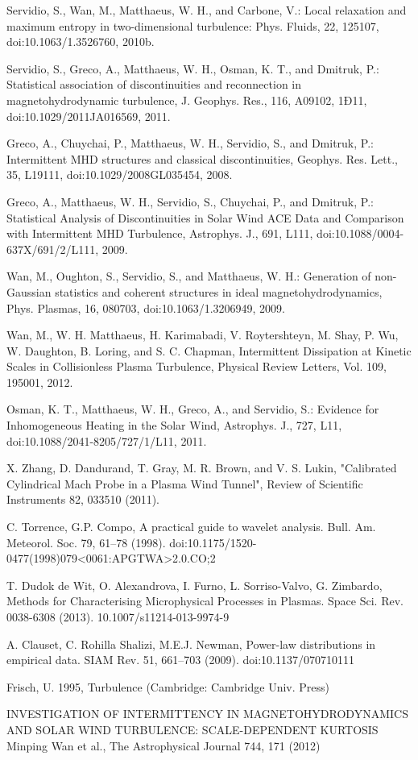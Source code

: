 \documentclass[12pt]{iopart}
\begin{document}
\begin{thebibliography}{10}
Servidio, S., Wan, M., Matthaeus, W. H., and Carbone, V.: Local relaxation and maximum entropy in two-dimensional turbulence: Phys. Fluids, 22, 125107, doi:10.1063/1.3526760, 2010b.

Servidio, S., Greco, A., Matthaeus, W. H., Osman, K. T., and Dmitruk, P.: Statistical association of discontinuities and reconnection in magnetohydrodynamic turbulence, J. Geophys. Res., 116, A09102, 1Ð11, doi:10.1029/2011JA016569, 2011.

Greco, A., Chuychai, P., Matthaeus, W. H., Servidio, S., and Dmitruk, P.: Intermittent MHD structures and classical discontinuities, Geophys. Res. Lett., 35, L19111, doi:10.1029/2008GL035454, 2008.

Greco, A., Matthaeus, W. H., Servidio, S., Chuychai, P., and Dmitruk, P.: Statistical Analysis of Discontinuities in Solar Wind ACE Data and Comparison with Intermittent MHD Turbulence, Astrophys. J., 691, L111, doi:10.1088/0004-637X/691/2/L111, 2009.

Wan, M., Oughton, S., Servidio, S., and Matthaeus, W. H.: Generation of non-Gaussian statistics and coherent structures in ideal magnetohydrodynamics, Phys. Plasmas, 16, 080703, doi:10.1063/1.3206949, 2009.

Wan, M., W. H. Matthaeus, H. Karimabadi, V. Roytershteyn, M. Shay, P. Wu, W. Daughton, B. Loring, and S. C. Chapman, Intermittent Dissipation at Kinetic Scales in Collisionless Plasma Turbulence, Physical Review Letters, Vol. 109, 195001, 2012. 

Osman, K. T., Matthaeus, W. H., Greco, A., and Servidio, S.: Evidence for Inhomogeneous Heating in the Solar Wind, Astrophys. J., 727, L11, doi:10.1088/2041-8205/727/1/L11, 2011.

X. Zhang, D. Dandurand, T. Gray, M. R. Brown, and V. S. Lukin, "Calibrated Cylindrical Mach Probe in a Plasma Wind Tunnel", Review of Scientific Instruments 82, 033510 (2011).

C. Torrence, G.P. Compo, A practical guide to wavelet analysis. Bull. Am. Meteorol. Soc. 79, 61–78 (1998). doi:10.1175/1520-0477(1998)079<0061:APGTWA>2.0.CO;2

T. Dudok de Wit, O. Alexandrova, I. Furno, L. Sorriso-Valvo, G. Zimbardo, Methods for Characterising Microphysical Processes in Plasmas. Space Sci. Rev. 0038-6308 (2013). 10.1007/s11214-013-9974-9

A. Clauset, C. Rohilla Shalizi, M.E.J. Newman, Power-law distributions in empirical data. SIAM Rev. 51, 661–703 (2009). doi:10.1137/070710111

Frisch, U. 1995, Turbulence (Cambridge: Cambridge Univ. Press)

INVESTIGATION OF INTERMITTENCY IN MAGNETOHYDRODYNAMICS AND SOLAR WIND TURBULENCE: SCALE-DEPENDENT KURTOSIS
Minping Wan et al., The Astrophysical Journal 744, 171 (2012)

\end{thebibliography}
\end{document}
